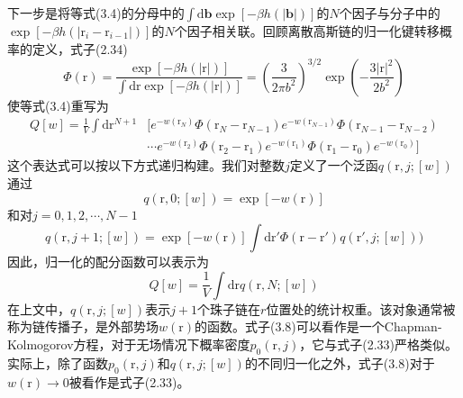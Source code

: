 下一步是将等式(3.4)的分母中的$\int\mathrm{d}\mathbf{b}\exp[-\beta h(\left|\mathbf{b}\right|)]$的$N$个因子与分子中的$\exp[-\beta h(\left|\mathrm{r}_i-\mathrm{r}_{i-1}\right|)]$的$N$个因子相关联。回顾离散高斯链的归一化键转移概率的定义，式子(2.34)
\begin{equation}
\Phi(\mathrm{r})=\frac{\exp[-\beta h(\left|\mathrm{r}\right|)]}{\int\mathrm{d}\mathrm{r}\exp[-\beta h(\left|\mathrm{r}\right|)]}=\left(\frac{3}{2\pi b^2}\right)^{3/2}\exp\left(-\frac{3\left|\mathrm{r}\right|^2}{2b^2}\right)
\end{equation}
使等式(3.4)重写为
\begin{equation}
\begin{aligned}
Q[w]=\frac{1}{V}\int\mathrm{d}\mathrm{r}^{N+1}&[e^{-w(\mathrm{r}_N)}\Phi(\mathrm{r}_N-\mathrm{r}_{N-1})e^{-w(\mathrm{r}_{N-1})}\Phi(\mathrm{r}_{N-1}-\mathrm{r}_{N-2})\\
&\cdots e^{-w(\mathrm{r}_2)}\Phi(\mathrm{r}_2-\mathrm{r}_1)e^{-w(\mathrm{r}_1)}\Phi(\mathrm{r}_1-\mathrm{r}_0)e^{-w(\mathrm{r}_0)}]
\end{aligned}
\end{equation}
这个表达式可以按以下方式递归构建。我们对整数$j$定义了一个泛函$q(\mathrm{r},j;[w])$通过
\begin{equation}
q(\mathrm{r},0;[w])=\exp[-w(\mathrm{r})]
\end{equation}
和对$j=0,1,2,\cdots,N-1$
\begin{equation}
q(\mathrm{r},j+1;[w])=\exp[-w(\mathrm{r})]\int\mathrm{d}\mathrm{r}'\Phi(\mathrm{r}-\mathrm{r}')q(\mathrm{r}',j;[w]))
\end{equation}
因此，归一化的配分函数可以表示为
\begin{equation}
Q[w]=\frac{1}{V}\int\mathrm{d}\mathrm{r}q(\mathrm{r},N;[w])
\end{equation}
在上文中，$q(\mathrm{r},j;[w])$表示$j+1$个珠子链在$r$位置处的统计权重。该对象通常被称为链传播子，是外部势场$w(\mathrm{r})$的函数。式子(3.8)可以看作是一个Chapman-Kolmogorov方程，对于无场情况下概率密度$p_0(\mathrm{r},j)$，它与式子(2.33)严格类似。实际上，除了函数$p_0(\mathrm{r},j)$和$q(\mathrm{r},j;[w])$的不同归一化之外，式子(3.8)对于$w(\mathrm{r})\rightarrow 0$被看作是式子(2.33)。

